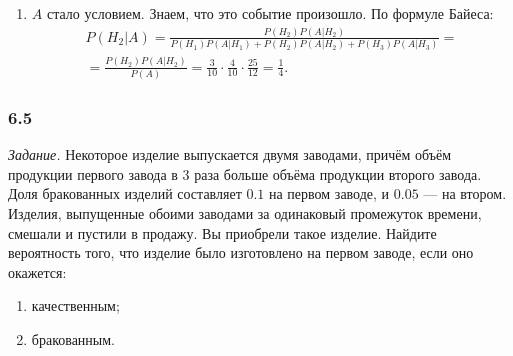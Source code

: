 \begin{enumerate}[label=\alph*)]
\item $A$ стало условием.
Знаем, что это событие произошло.
По формуле Байеса:
\begin{equation*}
\begin{split}
P \left( \left. H_2 \right| A \right) =
\frac{P \left( H_2 \right) P \left( \left. A \right| H_2 \right) }{P \left( H_1 \right) P \left( \left. A \right| H_1 \right) +
P \left( H_2 \right) P \left( \left. A \right| H_2 \right) + P \left( H_3 \right) P \left( \left. A \right| H_3 \right) } = \\
= \frac{P \left( H_2 \right) P \left( \left. A \right| H_2 \right) }{P \left( A \right) } =
\frac{3}{10} \cdot \frac{4}{10} \cdot \frac{25}{12} =
\frac{1}{4}.
\end{split}
\end{equation*}
\end{enumerate}

\subsubsection*{6.5}

\textit{Задание.} Некоторое изделие выпускается двумя заводами, причём объём продукции первого завода в 3 раза больше объёма продукции второго завода.
Доля бракованных изделий составляет $0.1$ на первом заводе, и $0.05$ --- на втором.
Изделия, выпущенные обоими заводами за одинаковый промежуток времени, смешали и пустили в продажу.
Вы приобрели такое изделие.
Найдите вероятность того, что изделие было изготовлено на первом заводе, если оно окажется:
\begin{enumerate}[label=\alph*)]
\item качественным;
\item бракованным.
\end{enumerate}


